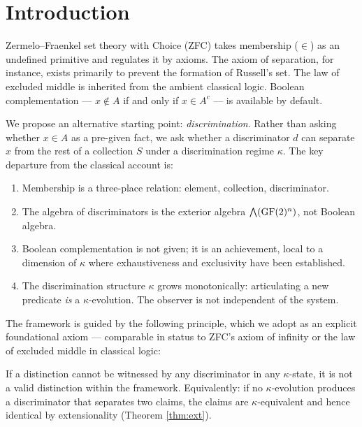 \section{Introduction}

Zermelo--Fraenkel set theory with Choice (ZFC) takes membership
($\in$) as an undefined primitive and regulates it by axioms.
The axiom of separation, for instance, exists primarily to prevent
the formation of Russell's set. The law of excluded middle is
inherited from the ambient classical logic. Boolean complementation
--- $x \notin A$ if and only if $x \in A^c$ --- is available by default.

We propose an alternative starting point: \emph{discrimination}.
Rather than asking whether $x \in A$ as a pre-given fact, we ask
whether a discriminator $d$ can separate $x$ from the rest of a
collection $S$ under a discrimination regime $\kappa$. The key
departure from the classical account is:

\begin{enumerate}[label=(\roman*)]
  \item Membership is a three-place relation: element, collection,
    discriminator.
  \item The algebra of discriminators is the exterior algebra
    $\bigwedge(\operatorname{GF}(2)^n)$, not Boolean algebra.
  \item Boolean complementation is not given; it is an achievement,
    local to a dimension of $\kappa$ where exhaustiveness and
    exclusivity have been established.
  \item The discrimination structure $\kappa$ grows monotonically:
    articulating a new predicate \emph{is} a $\kappa$-evolution.
    The observer is not independent of the system.
\end{enumerate}

The framework is guided by the following principle, which
we adopt as an explicit foundational axiom --- comparable
in status to ZFC's axiom of infinity or the law of excluded
middle in classical logic:

\begin{definition}\label{def:operationalist}
If a distinction cannot be witnessed by any discriminator
in any $\kappa$-state, it is not a valid distinction within
the framework. Equivalently: if no $\kappa$-evolution
produces a discriminator that separates two claims, the
claims are $\kappa$-equivalent and hence identical by
extensionality (Theorem \ref{thm:ext}).
\end{definition}

